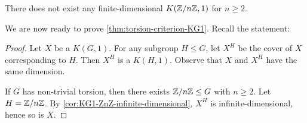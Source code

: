 \begin{corollary}
    \label{cor:KG1-ZnZ-infinite-dimensional}
    There does not exist any finite-dimensional \(K(\mathbb{Z}/n\mathbb{Z}, 1)\) for \(n\geq 2\).
\end{corollary}

We are now ready to prove \cref{thm:torsion-criterion-KG1}. Recall the statement:

\TorsionCriterion*

\begin{proof}
\label{proof:torsion-criterion-KG1}
    Let \(X\) be a \(K(G,1)\). For any subgroup \(H\leq G\), let \(X^H\) be the cover of \(X\) corresponding to \(H\). Then \(X^H\) is a \(K(H,1)\). Observe that \(X\) and \(X^H\) have the same dimension.

    If \(G\) has non-trivial torsion, then there exists \(\mathbb{Z}/n\mathbb{Z} \leq G\) with \(n\geq 2\). Let \(H = \mathbb{Z} /n \mathbb{Z}\). By \cref{cor:KG1-ZnZ-infinite-dimensional}, \(X^H\) is infinite-dimensional, hence so is \(X\).
\end{proof}